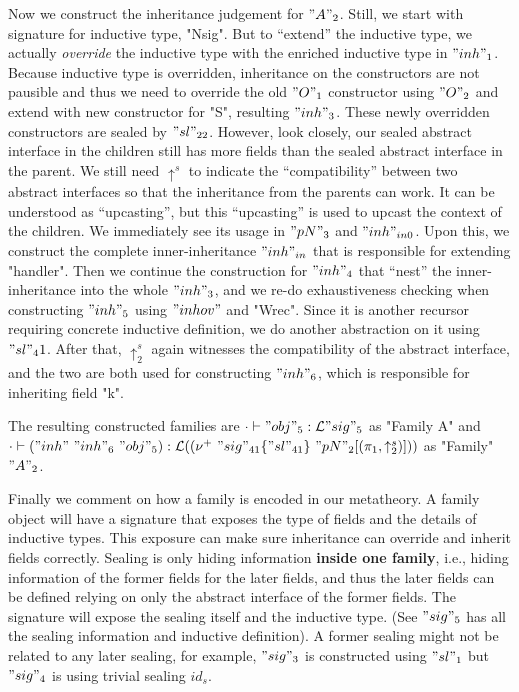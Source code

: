 Now we construct the inheritance judgement for $"A"_2$. Still, we start
with signature for inductive type, "Nsig". But to ``extend'' the
inductive type, we actually \textit{override} the inductive type with
the enriched inductive type in $"inh"_1$. Because inductive type is
overridden, inheritance on the constructors are not pausible and thus we
need to override the old $"O"_1$ constructor using $"O"_2$ and extend
with new constructor for "S", resulting $"inh"_3$. These newly
overridden constructors are sealed by $"sl"_{22}$. However, look
closely, our sealed abstract interface in the children still has more
fields than the sealed abstract interface in the parent. We still need
$\uparrow^s$ to indicate the ``compatibility'' between two abstract
interfaces so that the inheritance from the parents can work. It can be
understood as ``upcasting'', but this ``upcasting'' is used to upcast
the context of the children. We immediately see its usage in $"pN"_3$
and $"inh"_{in0}$. Upon this, we construct the complete
inner-inheritance $"inh"_{in}$ that is responsible for extending
"handler". Then we continue the construction for $"inh"_4$ that ``nest''
the inner-inheritance into the whole $"inh"_3$, and we re-do
exhaustiveness checking when constructing $"inh"_5$ using $"inhov"$ and
"Wrec". Since it is another recursor requiring concrete inductive
definition, we do another abstraction on it using $"sl"_41$. After that,
$\uparrow^s_2$ again witnesses the compatibility of the abstract
interface, and the two are both used for constructing $"inh"_6$, which
is responsible for inheriting field "k".

The resulting constructed families are
${ {\cdot} \vdash {"obj"_5} : {{\mathcal{L}}"sig"_5} }$ as "Family A" and \\
${ {\cdot} \vdash {("inh"~"inh"_6~"obj"_5)} : {{\mathcal{L}}((\nu^+ \ "sig"_{41}
\{"sl"_{41}\} \ "pN"_2[(\pi_1, \uparrow^s_2)]))} }$ as "Family" $"A"_2$.

Finally we comment on how a family is encoded in our metatheory.
A family object will have a signature that exposes the type
of fields and the details of inductive types. This exposure can make
sure inheritance can override and inherit fields correctly. Sealing is
only hiding information \textbf{inside one family}, i.e., hiding
information of the former fields for the later fields, and thus the
later fields can be defined relying on only the abstract interface of
the former fields.
The signature will expose the sealing itself and the inductive type.
(See $"sig"_5$ has all the sealing information and inductive
definition). A former sealing might not be related to any later sealing,
for example, $"sig"_3$ is constructed using $"sl"_1$ but $"sig"_4$ is
using trivial sealing $id_s$.